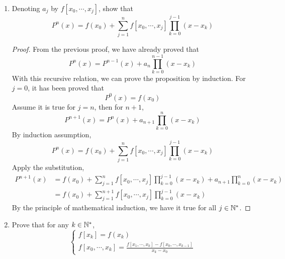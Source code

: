 \begin{enumerate}
\begin{enumerate}[(a)]
\begin{proof}
		Assume this holds for \(j=n\), which means for all $m$ such that \(0\leq m\leq n, P^n(x_m)=f(x_m)\).
		We need to prove
		\[ \forall m \textrm{ such that } 0\leq m\leq n+1, P^{n}(x_m)+a_{n+1}\prod_{k=0}^{n}(x_m-x_k) = f(x_m)  \]
		This is obvious for \(0\leq m\leq n\), since the product always contains a zero factor and is zero.
		So we just need the condition for \(m=n+1\).
		\[ P^{n}(x_{n+1})+a_{n+1}\prod_{k=0}^{n}(x_{n+1}-x_k) = f(x_{n+1}) \]
		Then we obtain the coefficient
		\[ a_{n+1}=\frac{f(x_{n+1})-P^{n}(x_{n+1})}{\prod_{k=0}^{n}(x_{n+1}-x_k)} \]
		This only depends on \(x_0,\cdots,x_{n+1}\).
		So we have
		\[ P^{n+1}(x):=P^n(x)+\frac{f(x_{n+1})-P^{n}(x_{n+1})}{\prod_{k=0}^{n}(x_{n+1}-x_k)}\prod_{k=0}^{n}(x-x_k) \]
		which interpolates \(f(x)\) in \(x_0,\cdots,x_{n+1}\).
		This is a polynomial with degree at most $n+1$.
		By invertibility of Vandermonde matrix, we know that $n+1$ distinct points can uniquely determine a polynomial with degree at most $n+1$.
		So this definition exactly define the interpolation polynomial of \(f(x)\).
		By the principle of mathematical induction, we have it true for all \(j\in\N^*\).
		\end{proof}
	\end{enumerate}
	\item Denoting $a_j$ by \(f[x_0,\cdots, x_j]\), show that
	\[ P^n(x)=f(x_0)+\sum_{j=1}^{n} f[x_0,\cdots, x_j] \prod_{k=0}^{j-1}(x-x_k) \]
	\begin{proof}
	From the previous proof, we have already proved that
	\[ P^n(x)=P^{n-1}(x)+a_n\prod_{k=0}^{n-1}(x-x_k) \]
	With this recursive relation, we can prove the proposition by induction.
	For $j=0$, it has been proved that
	\[ P^0(x)=f(x_0) \]
	Assume it is true for \(j=n\), then for $n+1$,
	\[ P^{n+1}(x)=P^{n}(x)+a_{n+1}\prod_{k=0}^{n}(x-x_k) \]
	By induction assumption,
	\[ P^n(x)=f(x_0)+\sum_{j=1}^{n} f[x_0,\cdots, x_j] \prod_{k=0}^{j-1}(x-x_k) \]
	Apply the substitution,
	\begin{align*}
	P^{n+1}(x)&=f(x_0)+\sum_{j=1}^{n} f[x_0,\cdots, x_j]\prod_{k=0}^{j-1}(x-x_k)+a_{n+1}\prod_{k=0}^{n}(x-x_k)\\
	&=f(x_0)+\sum_{j=1}^{n+1} f[x_0,\cdots, x_j]\prod_{k=0}^{j-1}(x-x_k)
	\end{align*}
	By the principle of mathematical induction, we have it true for all \(j\in\N^*\).
	\end{proof}
	\item Prove that for any \(k\in\mathbb{N}^*\),
	\[ \begin{cases} f[x_k] =f(x_k) \\ f[x_0,\cdots, x_k]=\frac{f[x_1,\cdots, x_k]-f[x_0,\cdots, x_{k-1}]}{x_k-x_0} \end{cases} \]

\end{enumerate}
